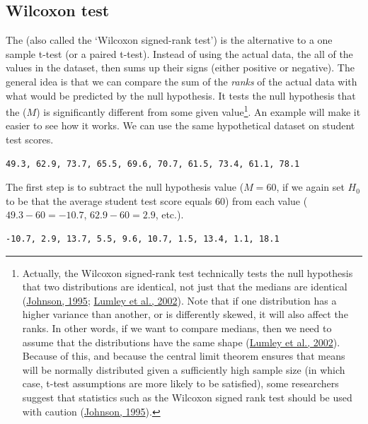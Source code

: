 \documentclass[
  openany]{krantz}
\begin{document}
\hypertarget{wilcoxon-test}{%
\subsection{Wilcoxon test}\label{wilcoxon-test}}

The  (also called the `Wilcoxon signed-rank test') is the  alternative to a one sample t-test (or a paired t-test).
Instead of using the actual data, the   all of the values in the dataset, then sums up their signs (either positive or negative).
The general idea is that we can compare the sum of the \emph{ranks} of the actual data with what would be predicted by the null hypothesis.
It tests the null hypothesis that the \emph{} (\(M\)) is significantly different from some given value\footnote{Actually, the Wilcoxon signed-rank test technically tests the null hypothesis that two distributions are identical, not just that the medians are identical (\protect\hyperlink{ref-Johnson1995}{Johnson, 1995}; \protect\hyperlink{ref-Lumley2002}{Lumley et al., 2002}). Note that if one distribution has a higher variance than another, or is differently skewed, it will also affect the ranks. In other words, if we want to compare medians, then we need to assume that the distributions have the same shape (\protect\hyperlink{ref-Lumley2002}{Lumley et al., 2002}). Because of this, and because the central limit theorem ensures that means will be normally distributed given a sufficiently high sample size (in which case, t-test assumptions are more likely to be satisfied), some researchers suggest that  statistics such as the Wilcoxon signed rank test should be used with caution (\protect\hyperlink{ref-Johnson1995}{Johnson, 1995}).}.
An example will make it easier to see how it works.
We can use the same hypothetical dataset on student test scores.

\begin{verbatim}
49.3, 62.9, 73.7, 65.5, 69.6, 70.7, 61.5, 73.4, 61.1, 78.1
\end{verbatim}

The first step is to subtract the null hypothesis value (\(M = 60\), if we again set \(H_{0}\) to be that the average student test score equals 60) from each value (\(49.3 - 60 = -10.7\), \(62.9 - 60 = 2.9\), etc.).

\begin{verbatim}
-10.7, 2.9, 13.7, 5.5, 9.6, 10.7, 1.5, 13.4, 1.1, 18.1
\end{verbatim}
\end{document}
